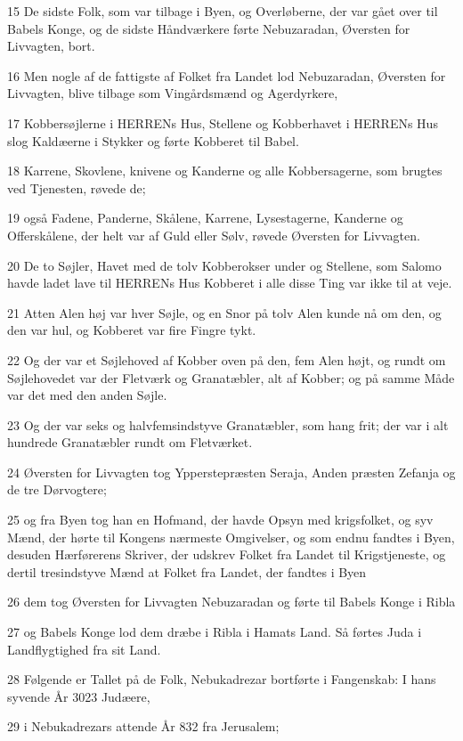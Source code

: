 \par 15 De sidste Folk, som var tilbage i Byen, og Overløberne, der var gået over til Babels Konge, og de sidste Håndværkere førte Nebuzaradan, Øversten for Livvagten, bort.
\par 16 Men nogle af de fattigste af Folket fra Landet lod Nebuzaradan, Øversten for Livvagten, blive tilbage som Vingårdsmænd og Agerdyrkere,
\par 17 Kobbersøjlerne i HERRENs Hus, Stellene og Kobberhavet i HERRENs Hus slog Kaldæerne i Stykker og førte Kobberet til Babel.
\par 18 Karrene, Skovlene, knivene og Kanderne og alle Kobbersagerne, som brugtes ved Tjenesten, røvede de;
\par 19 også Fadene, Panderne, Skålene, Karrene, Lysestagerne, Kanderne og Offerskålene, der helt var af Guld eller Sølv, røvede Øversten for Livvagten.
\par 20 De to Søjler, Havet med de tolv Kobberokser under og Stellene, som Salomo havde ladet lave til HERRENs Hus Kobberet i alle disse Ting var ikke til at veje.
\par 21 Atten Alen høj var hver Søjle, og en Snor på tolv Alen kunde nå om den, og den var hul, og Kobberet var fire Fingre tykt.
\par 22 Og der var et Søjlehoved af Kobber oven på den, fem Alen højt, og rundt om Søjlehovedet var der Fletværk og Granatæbler, alt af Kobber; og på samme Måde var det med den anden Søjle.
\par 23 Og der var seks og halvfemsindstyve Granatæbler, som hang frit; der var i alt hundrede Granatæbler rundt om Fletværket.
\par 24 Øversten for Livvagten tog Ypperstepræsten Seraja, Anden præsten Zefanja og de tre Dørvogtere;
\par 25 og fra Byen tog han en Hofmand, der havde Opsyn med krigsfolket, og syv Mænd, der hørte til Kongens nærmeste Omgivelser, og som endnu fandtes i Byen, desuden Hærførerens Skriver, der udskrev Folket fra Landet til Krigstjeneste, og dertil tresindstyve Mænd at Folket fra Landet, der fandtes i Byen
\par 26 dem tog Øversten for Livvagten Nebuzaradan og førte til Babels Konge i Ribla
\par 27 og Babels Konge lod dem dræbe i Ribla i Hamats Land. Så førtes Juda i Landflygtighed fra sit Land.
\par 28 Følgende er Tallet på de Folk, Nebukadrezar bortførte i Fangenskab: I hans syvende År 3023 Judæere,
\par 29 i Nebukadrezars attende År 832 fra Jerusalem;
